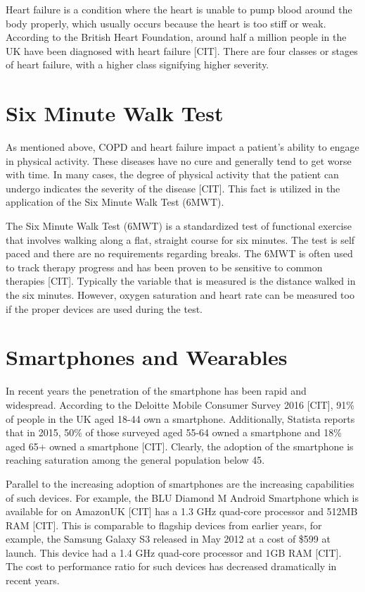             Heart failure is a condition where the heart is unable to pump blood around the body properly, which usually occurs because the heart is too stiff or weak. According to the British Heart Foundation, around half a million people in the UK have been diagnosed with heart failure [CIT]. There are four classes or stages of heart failure, with a higher class signifying higher severity. 

        \section{Six Minute Walk Test}

            As mentioned above, COPD and heart failure impact a patient's ability to engage in physical activity. These diseases have no cure and generally tend to get worse with time. In many cases, the degree of physical activity that the patient can undergo indicates the severity of the disease [CIT]. This fact is utilized in the application of the Six Minute Walk Test (6MWT).

            The Six Minute Walk Test (6MWT) is a standardized test of functional exercise that involves walking along a flat, straight course for six minutes. The test is self paced and there are no requirements regarding breaks. The 6MWT is often used to track therapy progress and has been proven to be sensitive to common therapies [CIT]. Typically the variable that is measured is the distance walked in the six minutes. However, oxygen saturation and heart rate can be measured too if the proper devices are used during the test.

        \section{Smartphones and Wearables}

            In recent years the penetration of the smartphone has been rapid and widespread. According to the Deloitte Mobile Consumer Survey 2016 [CIT], 91\% of people in the UK aged 18-44 own a smartphone. Additionally, Statista reports that in 2015, 50\% of those surveyed aged 55-64 owned a smartphone and 18\% aged 65+ owned a smartphone [CIT]. Clearly, the adoption of the smartphone is reaching saturation among the general population below 45.

            Parallel to the increasing adoption of smartphones are the increasing capabilities of such devices. For example, the BLU Diamond M Android Smartphone which is available for  on AmazonUK [CIT] has a 1.3 GHz quad-core processor and 512MB RAM [CIT]. This is comparable to flagship devices from earlier years, for example, the Samsung Galaxy S3 released in May 2012 at a cost of \$599 at launch. This device had a 1.4 GHz quad-core processor and 1GB RAM [CIT]. The cost to performance ratio for such devices has decreased dramatically in recent years.

